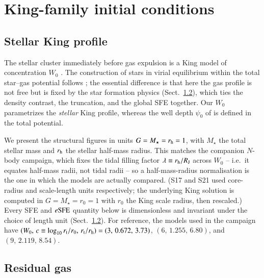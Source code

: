 \documentclass{aa}
\newcommand{\esfe}{e{\rm SFE}}
\newcommand{\rtid}{r_{\rm t}}
\begin{document}
\section{King-family initial conditions}
\label{sec:ics}

\subsection{Stellar King profile}
\label{sec:stars}

The stellar cluster immediately before gas expulsion is a King model of
concentration $W_0$ \citep{King1966}. The construction of stars in
virial equilibrium within the total star--gas potential follows
\citet{Adams2000}; the essential difference is that here the gas profile
is not free but is fixed by the star formation physics
(Sect.~\ref{sec:gas}), which ties the density contrast, the truncation,
and the global SFE together. Our $W_0$ parametrizes the \emph{stellar}
King profile, whereas the well depth $\psi_0$ of \citet{Adams2000} is
defined in the total potential.

We present the structural figures in units $G=M_\star=r_{\rm h}=1$, with
$M_\star$ the total stellar mass and $r_{\rm h}$ the stellar half-mass
radius. This matches the companion $N$-body campaign, which fixes the
tidal filling factor $\lambda\equiv r_{\rm h}/R_{\rm J}$ across $W_0$ --
i.e.\ it equates half-mass radii, not tidal radii -- so a half-mass-radius
normalisation is the one in which the models are actually compared. (S17
and S21 used core-radius and scale-length units respectively; the
underlying King solution is computed in $G=M_\star=r_0=1$ with $r_0$ the
King scale radius, then rescaled.) Every SFE and $\esfe$ quantity below is
dimensionless and invariant under the choice of length unit
(Sect.~\ref{sec:gas}). For reference, the models used in the campaign
have
$(W_0,\,c\equiv\log_{10}\rtid/r_0,\,r_{\rm t}/r_{\rm h})=
(3,\,0.672,\,3.73)$, $(6,\,1.255,\,6.80)$, and $(9,\,2.119,\,8.54)$.

\subsection{Residual gas}
\label{sec:gas}
\end{document}
